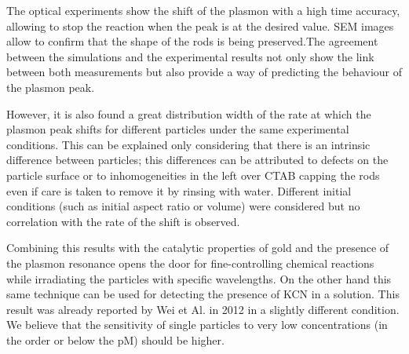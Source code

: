 \documentclass[twocolumn]{article}
\begin{document}
The optical experiments show the shift of the plasmon with a high time accuracy,
allowing to stop the reaction when the peak is at the desired value. SEM images
allow to confirm that the shape of the rods is being preserved.The agreement
between the simulations and the experimental results not only show the link
between both measurements but also provide a way of predicting the behaviour of
the plasmon peak.

However, it is also found a great distribution width of the rate at which the
plasmon peak shifts for different particles under the same experimental
conditions. This can be explained only considering that there is an intrinsic
difference between particles; this differences can be attributed to defects on
the particle surface or to inhomogeneities in the left over CTAB capping the
rods even if care is taken to remove it by rinsing with water. Different initial
conditions (such as initial aspect ratio or volume) were considered but no
correlation with the rate of the shift is observed.

Combining this results with the catalytic properties of gold and the presence of
the plasmon resonance opens the door for fine-controlling chemical reactions
while irradiating the particles with specific wavelengths. On the other hand
this same technique can be used for detecting the presence of KCN in a
solution. This result was already reported by Wei et Al. in 2012 \cite{Wei2012}
in a slightly different condition. We believe that the sensitivity of single
particles to very low concentrations (in the order or below the pM) should be
higher.

{}

\end{document}
